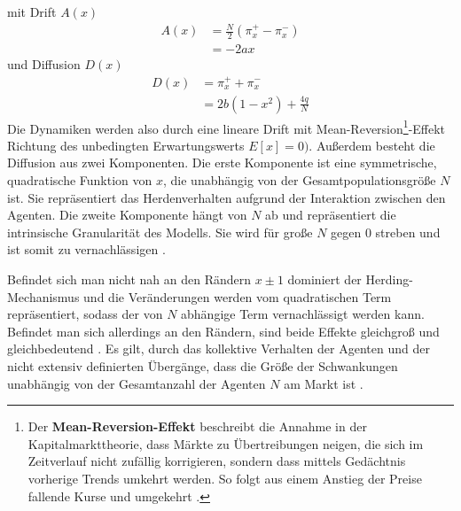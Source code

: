 \documentclass[ngerman]{ttlab-qualify}
\begin{document}
mit Drift $A(x)$
\begin{align}
\label{eq:AL-drift}
A(x) &= \frac{N}{2}(\pi_x^+-\pi_x^-) \nonumber \\
&= -2ax
\end{align}
und Diffusion $D(x)$
\begin{align}
\label{eq:AL-diff}
D(x)&= \pi_x^++\pi_x^- \nonumber \\
&= 2b(1-x^2)+\frac{4q}{N}
\end{align}
Die Dynamiken werden also durch eine lineare Drift mit Mean-Reversion\footnote{Der \textbf{Mean-Reversion-Effekt} beschreibt die Annahme in der Kapitalmarkttheorie, dass Märkte zu Übertreibungen neigen, die sich im Zeitverlauf nicht zufällig korrigieren, sondern dass mittels Gedächtnis vorherige Trends umkehrt werden. So folgt aus einem Anstieg der Preise fallende Kurse und umgekehrt \parencite{MeanReversion}.}-Effekt Richtung des unbedingten Erwartungswerts $E[x]=0)$.
Außerdem besteht die Diffusion aus zwei Komponenten. 
Die erste Komponente ist eine symmetrische, quadratische Funktion von $x$, die unabhängig von der Gesamtpopulationsgröße $N$ ist. Sie repräsentiert das Herdenverhalten aufgrund der Interaktion zwischen den Agenten. 
Die zweite Komponente hängt von $N$ ab und repräsentiert die intrinsische Granularität des Modells. Sie wird für große $N$ gegen 0 streben und ist somit zu vernachlässigen \parencite{AL:2008}.

Befindet sich man nicht nah an den Rändern $x\pm 1$ dominiert der Herding-Mechanismus und die Veränderungen werden vom quadratischen Term repräsentiert, sodass der von $N$ abhängige Term vernachlässigt werden kann. 
Befindet man sich allerdings an den Rändern, sind beide Effekte gleichgroß und gleichbedeutend \parencite{AL:2008}. 
Es gilt, durch das kollektive Verhalten der Agenten und der nicht extensiv definierten Übergänge, dass die Größe der Schwankungen unabhängig von der Gesamtanzahl der Agenten $N$ am Markt ist \parencite{AL:2008}.\\
\end{document}
